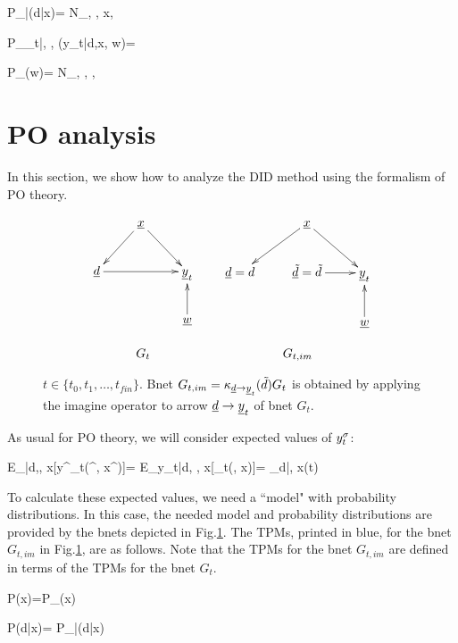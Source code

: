 \beq\color{blue}
P_{\rvd|\rvx}(d|x)= 
{N_{\cdot, \cdot, x, \cdot}}
\eeq

\beq\color{blue}
P_{\rvy_t|\rvd, \rvx, \rvw}(y_t|d,x, w)=
\eeq

\beq\color{blue}
P_{\rvw}(w)=  
{N_{\cdot, \cdot, \cdot, \cdot}}
\eeq

\section{PO analysis}
In this section,
we show how
to analyze the
DID method
using the formalism of PO theory.



\begin{figure}[h!]
$$
\begin{array}{ccccc}
\xymatrix{
&\rvx\ar[dl]\ar[dr]
\\
\rvd\ar[rr]&&\rvy_t
\\
&&\rvw\ar[u]
}
&&
\xymatrix{
&\rvx\ar[dl]\ar[dr]
\\
\rvd=d&\rvtd=\td\ar[r]&\rvy_t
\\
&&\rvw\ar[u]
}
\\
\\
G_t&&G_{t, im}
\end{array}
$$
\caption{$t\in \{t_0, t_1, \ldots, 
t_{fin}\}$.
Bnet 
$G_{t, im}= \kappa_{{\underline{d}}\rightarrow{\underline{y}}_t}
({\tilde{d}})G_t$
is obtained by applying 
the imagine operator to arrow 
${\underline{d}}\rightarrow{\underline{y}}_t$
of bnet $G_t$.}
\label{fig-syn-con-G-im}
\end{figure}

As usual for PO theory,
we will consider
expected values of $y^\sigma_t$:


\beq
E_{\s|d,\td, x}[y^\s_t(\td^\s, x^\s)]=
 E_{y_t|d, \td, x}[\rvy_t(\td, x)]=
\caly_{d|\td, x}(t)
\eeq

To calculate these
expected values, we need a ``model"
with probability 
distributions.
In this case,
the needed model and probability
distributions are
provided by the
bnets depicted in Fig.\ref{fig-syn-con-G-im}.
The TPMs,
printed in blue,
for the 
 bnet
$G_{t, im}$
in Fig.\ref{fig-syn-con-G-im},
are as follows.
Note
that the
TPMs for the bnet $G_{t, im}$
are defined in 
terms
of the TPMs for the bnet $G_t$.



\beq\color{blue}
P(x)=P_{\rvx}(x)
\eeq

\beq\color{blue}
P(d|x)= 
P_{\rvd|\rvx}(d|x)
\eeq
 
